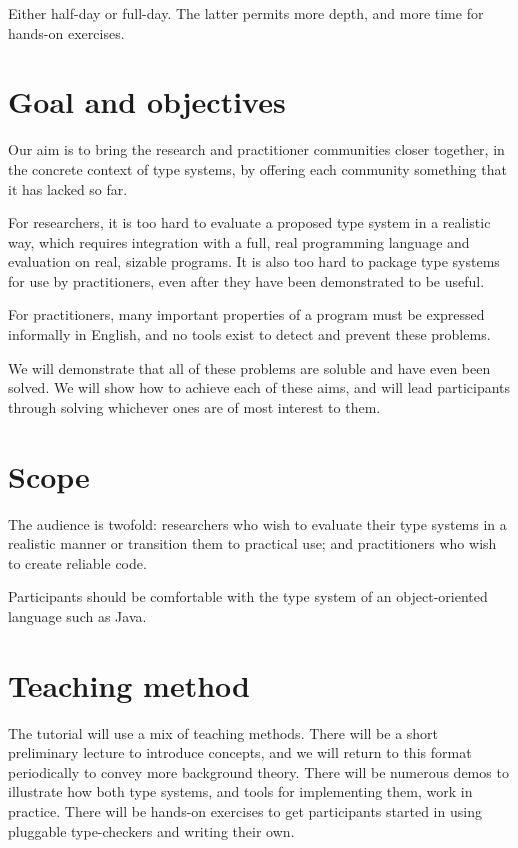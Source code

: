 \documentclass{sig-alternate} %
\begin{document}
Either half-day or full-day.  The latter permits more depth, and more time
for hands-on exercises.


\section{Goal and objectives}

Our aim is to bring the research and practitioner communities closer
together, in the concrete context of type systems, by offering each
community something that it has lacked so far.

For researchers, it is too hard to evaluate a proposed type system in a
realistic way, which requires integration with a full, real programming
language and evaluation on real, sizable programs.  It is also too hard to
package type systems for use by practitioners, even after they have been
demonstrated to be useful.

For practitioners, many important properties of a program must be expressed
informally in English, and no tools exist to detect and prevent these
problems.

We will demonstrate that all of these problems are soluble and have even
been solved.  We will show how to achieve each of these aims, and will lead
participants through solving whichever ones are of most interest to them.


\section{Scope}

The audience is twofold:  researchers who wish to evaluate their type
systems in a realistic manner or transition them to practical use; and
practitioners who wish to create reliable code.

Participants should be comfortable with the type system of an
object-oriented language such as Java.



\section{Teaching method}

The tutorial will use a mix of teaching methods.  There will be a short
preliminary lecture to introduce concepts, and we will return to this
format periodically to convey more background theory.  There will be
numerous demos to illustrate how both type systems, and tools for
implementing them, work in practice.  There will be hands-on exercises to
get participants started in using pluggable type-checkers and writing their
own.
\end{document}
